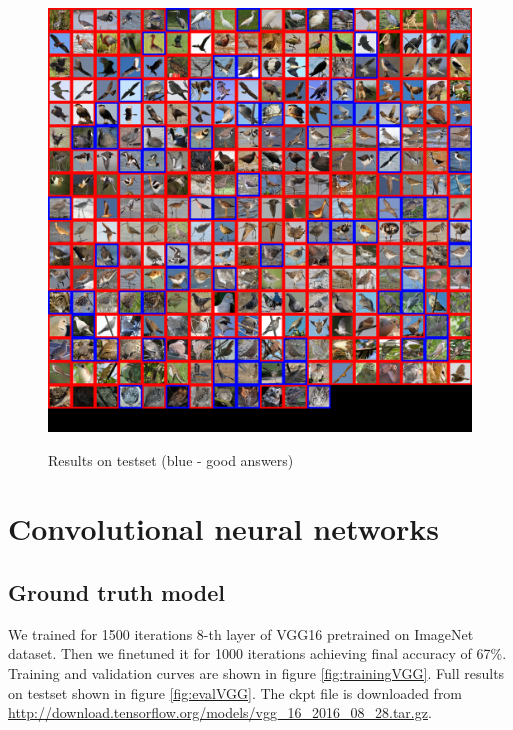 \documentclass[a4paper]{article}
\begin{document}
\begin{figure}[H]
    \caption[]{Results on testset (blue - good answers)}
    \centering
    \includegraphics[page=2,width=1.0\textwidth]{eval.png}
    \label{fig:eval}
\end{figure}

\newpage
\section{Convolutional neural networks}

\subsection{Ground truth model}

We trained for 1500 iterations 8-th layer of VGG16\cite{VGG16}
pretrained on ImageNet\cite{ImageNet} dataset.
Then we finetuned it for 1000 iterations achieving final accuracy of 67\%.
Training and validation curves are shown in figure \ref{fig:trainingVGG}.
Full results on testset shown in figure \ref{fig:evalVGG}.
The ckpt file is downloaded from \url{http://download.tensorflow.org/models/vgg_16_2016_08_28.tar.gz}.
\end{document}
